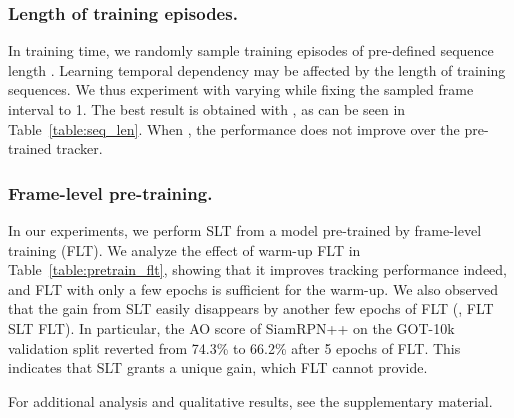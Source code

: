 \subsubsection{Length of training episodes.}
In training time, we randomly sample training episodes of pre-defined sequence length .
Learning temporal dependency may be affected by the length of training sequences.
We thus experiment with varying  while fixing the sampled frame interval to 1.
The best result is obtained with , as can be seen in Table~\ref{table:seq_len}.
When , the performance does not improve over the pre-trained tracker. 

\subsubsection{Frame-level pre-training.}
In our experiments, we perform SLT from a model pre-trained by frame-level training (FLT).
We analyze the effect of  warm-up FLT in Table~\ref{table:pretrain_flt}, showing that it improves tracking performance indeed, and FLT with only a few epochs is sufficient for the warm-up.
We also observed that the gain from SLT easily disappears by another few epochs of FLT (\ie, FLT  SLT  FLT).
In particular, the AO score of SiamRPN++ on the GOT-10k validation split reverted from 74.3\% to 66.2\% after 5 epochs of FLT.
This indicates that SLT grants a unique gain, which FLT cannot provide.


For additional analysis and qualitative results, see the supplementary material.
